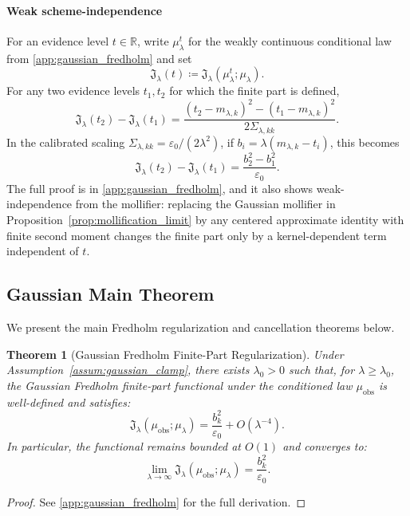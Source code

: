 \documentclass[preprint,12pt]{elsarticle}
\theoremstyle{plain}
\newtheorem{theorem}{Theorem}
\theoremstyle{definition}
\theoremstyle{remark}
\begin{document}
    \paragraph{Weak scheme-independence}
    For an evidence level $t\in\mathbb{R}$, write $\mu_\lambda^t$ for the weakly continuous conditional law from \ref{app:gaussian_fredholm} and set
    \[
    \mathfrak{J}_\lambda(t)\coloneqq
    \mathfrak{J}_\lambda(\mu_\lambda^t;\mu_\lambda).
    \]
    For any two evidence levels $t_1,t_2$ for which the finite part is defined,
    \begin{equation}
        \label{eq:weak_scheme_independence}
        \mathfrak{J}_\lambda(t_2)-\mathfrak{J}_\lambda(t_1)
        =
        \frac{(t_2-m_{\lambda,k})^2-(t_1-m_{\lambda,k})^2}
        {2\Sigma_{\lambda,kk}}.
    \end{equation}
    In the calibrated scaling $\Sigma_{\lambda,kk}=\varepsilon_0/(2\lambda^2)$, if
    $b_i=\lambda(m_{\lambda,k}-t_i)$, this becomes
    \[
    \mathfrak{J}_\lambda(t_2)-\mathfrak{J}_\lambda(t_1)
    =
    \frac{b_2^2-b_1^2}{\varepsilon_0}.
    \]
    The full proof is in \ref{app:gaussian_fredholm}, and it also shows
    weak-independence from the mollifier: replacing the Gaussian mollifier in
    Proposition~\ref{prop:mollification_limit} by any centered approximate identity with
    finite second moment changes the finite part only by a kernel-dependent term
    independent of $t$.

    \subsection{Gaussian Main Theorem}
    \label{sec:gaussian:theorem}

    We present the main Fredholm regularization and cancellation theorems below.

    \begin{theorem}[Gaussian Fredholm Finite-Part Regularization]
        \label{thm:finite_part_regularization}
        Under Assumption~\ref{assum:gaussian_clamp}, there exists $\lambda_0>0$ such that, for $\lambda\ge\lambda_0$, the Gaussian Fredholm finite-part functional under the conditioned law $\mu_{\mathrm{obs}}$ is well-defined and satisfies:
        \begin{equation}
            \label{eq:unified_regularization}
            \mathfrak{J}_\lambda(\mu_{\mathrm{obs}}; \mu_\lambda) = \frac{b_k^2}{\varepsilon_0} + O(\lambda^{-4}).
        \end{equation}
        In particular, the functional remains bounded at $O(1)$ and converges to:
        \begin{equation}
            \lim_{\lambda\to\infty} \mathfrak{J}_\lambda(\mu_{\mathrm{obs}}; \mu_\lambda) = \frac{b_k^2}{\varepsilon_0}.
        \end{equation}
    \end{theorem}
    \begin{proof}
        See \ref{app:gaussian_fredholm} for the full derivation.
    \end{proof}
\end{document}
